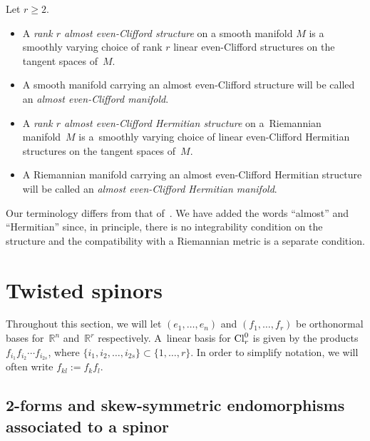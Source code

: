 \documentclass[10pt,a4paper]{amsart}
\numberwithin{equation}{section}
\begin{document}
\begin{Definition} Let $r\geq 2$.
\begin{itemize}\itemsep=0pt
\item A {\em rank $r$ almost even-Clifford structure} on a smooth manifold $M$ is a smoothly varying choice of rank $r$ linear even-Clifford structures on the tangent spaces of~$M$.
\item A smooth manifold carrying an almost even-Clifford structure will be called an {\em almost even-Clifford manifold}.
\item A {\em rank $r$ almost even-Clifford Hermitian structure} on a~Riemannian manifold~$M$ is a~smoo\-th\-ly varying choice of linear even-Clifford Hermitian structures on the tangent spaces of~$M$.
\item A Riemannian manifold carrying an almost even-Clifford Hermitian structure will be called an {\em almost even-Clifford Hermitian manifold}.
\end{itemize}
\end{Definition}

\begin{Remark} Our terminology differs from that of~\cite{Moroianu-Semmelmann}. We have added the words ``almost'' and ``Hermitian'' since, in principle, there is no integrability condition on the structure and the compatibility with a Riemannian metric is a separate condition.
\end{Remark}

\section{Twisted spinors}\label{sec:algebraic-setup}

Throughout this section, we will let $(e_1,\dots, e_n)$ and $(f_1,\dots, f_r)$ be orthonormal bases for~$\mathbb{R}^n$ and~$\mathbb{R}^r$ respectively. A~linear basis for ${\rm Cl}_r^0$ is given by the products $f_{i_1}f_{i_2}\cdots f_{i_{2s}}$, where $\{i_1,i_2,\dots,i_{2s}\}\subset \{1,\dots , r\}$. In order to simplify notation, we will often write
$f_{kl}:=f_kf_l$.

\subsection{2-forms and skew-symmetric endomorphisms associated to a spinor}
\end{document}
